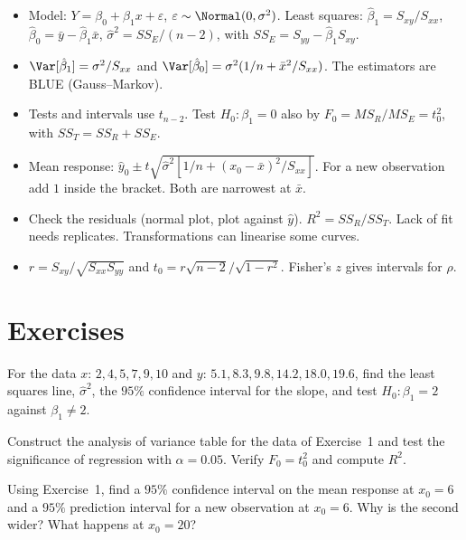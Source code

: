 \begin{summarybox}
\begin{itemize}
  \item Model: $Y=\beta_0+\beta_1x+\varepsilon$, $\varepsilon\sim\Normal(0,\sigma^2)$. Least squares: $\hat\beta_1=S_{xy}/S_{xx}$, $\hat\beta_0=\bar{y}-\hat\beta_1\bar{x}$, $\hat\sigma^2=SS_E/(n-2)$, with $SS_E=S_{yy}-\hat\beta_1S_{xy}$.
  \item $\Var[\hat\beta_1]=\sigma^2/S_{xx}$ and $\Var[\hat\beta_0]=\sigma^2(1/n+\bar{x}^2/S_{xx})$. The estimators are BLUE (Gauss--Markov).
  \item Tests and intervals use $t_{n-2}$. Test $H_0:\beta_1=0$ also by $F_0=MS_R/MS_E=t_0^2$, with $SS_T=SS_R+SS_E$.
  \item Mean response: $\hat{y}_0\pm t\sqrt{\hat\sigma^2[1/n+(x_0-\bar{x})^2/S_{xx}]}$. For a new observation add $1$ inside the bracket. Both are narrowest at $\bar{x}$.
  \item Check the residuals (normal plot, plot against $\hat{y}$). $R^2=SS_R/SS_T$. Lack of fit needs replicates. Transformations can linearise some curves.
  \item $r=S_{xy}/\sqrt{S_{xx}S_{yy}}$ and $t_0=r\sqrt{n-2}/\sqrt{1-r^2}$. Fisher's $z$ gives intervals for $\rho$.
\end{itemize}
\end{summarybox}

\section{Exercises}

\begin{exercise}
For the data $x$: $2,4,5,7,9,10$ and $y$: $5.1,8.3,9.8,14.2,18.0,19.6$, find the least squares line, $\hat\sigma^2$, the $95\%$ confidence interval for the slope, and test $H_0:\beta_1=2$ against $\beta_1\ne2$.
\end{exercise}

\begin{exercise}
Construct the analysis of variance table for the data of Exercise~1 and test the significance of regression with $\alpha=0.05$. Verify $F_0=t_0^2$ and compute $R^2$.
\end{exercise}

\begin{exercise}
Using Exercise~1, find a $95\%$ confidence interval on the mean response at $x_0=6$ and a $95\%$ prediction interval for a new observation at $x_0=6$. Why is the second wider? What happens at $x_0=20$?
\end{exercise}

